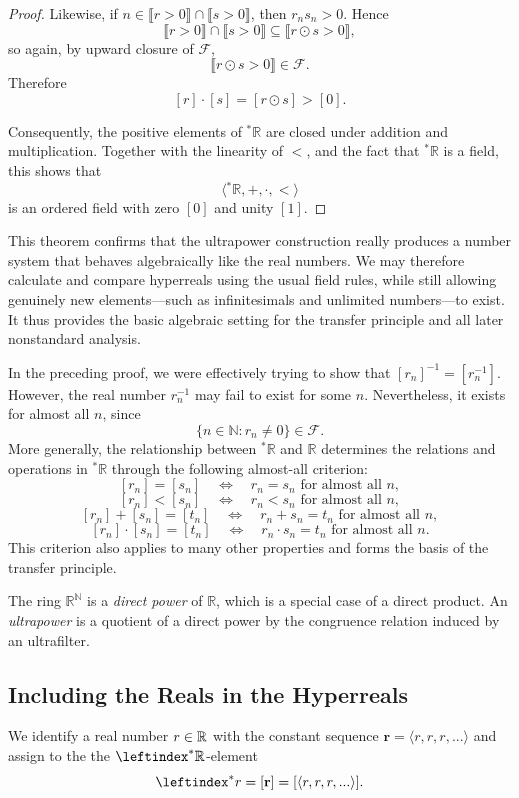 \begin{proof}
Likewise, if
$n\in\llbracket r>0\rrbracket\cap\llbracket s>0\rrbracket$,
then $r_ns_n>0$. Hence
\[
\llbracket r>0\rrbracket\cap\llbracket s>0\rrbracket
\subseteq
\llbracket r\odot s>0\rrbracket,
\]
so again, by upward closure of $\mathcal{F}$,
\[
\llbracket r\odot s>0\rrbracket\in\mathcal{F}.
\]
Therefore
\[
[r]\cdot[s]=[r\odot s]>[0].
\]

Consequently, the positive elements of ${}^*\mathbb{R}$ are closed
under addition and multiplication. Together with the linearity of $<$,
and the fact that ${}^*\mathbb{R}$ is a field, this shows that
\[
\langle{}^*\mathbb{R},+,\cdot,<\rangle
\]
is an ordered field with zero $[0]$ and unity $[1]$.
\end{proof}

This theorem confirms that the ultrapower construction really produces a number system that behaves algebraically like the real numbers. We may therefore calculate and compare hyperreals using the usual field rules, while still allowing genuinely new elements—such as infinitesimals and unlimited numbers—to exist. It thus provides the basic algebraic setting for the transfer principle and all later nonstandard analysis. 

In the preceding proof, we were effectively trying to show that $[r_n]^{-1} = [r_n^{-1}]$. However, the real number $r_n^{-1}$ may fail to exist for some $n$. Nevertheless, it exists for almost all $n$, since
\[
\{n \in \mathbb{N} : r_n \neq 0\} \in \mathcal{F}.
\]
More generally, the relationship between ${}^\ast\mathbb{R}$ and $\mathbb{R}$ determines the relations and operations in ${}^\ast\mathbb{R}$ through the following almost-all criterion:
\[
[r_n] = [s_n]
\quad\Longleftrightarrow\quad
r_n = s_n \text{ for almost all } n,
\]
\[
[r_n] < [s_n]
\quad\Longleftrightarrow\quad
r_n < s_n \text{ for almost all } n,
\]
\[
[r_n] + [s_n] = [t_n]
\quad\Longleftrightarrow\quad
r_n + s_n = t_n \text{ for almost all } n,
\]
\[
[r_n] \cdot [s_n] = [t_n]
\quad\Longleftrightarrow\quad
r_n \cdot s_n = t_n \text{ for almost all } n.
\]
This criterion also applies to many other properties and forms the basis of the transfer principle.

The ring $\mathbb{R}^{\mathbb{N}}$ is a \emph{direct power} of $\mathbb{R}$, which is a special case of a direct product. An \emph{ultrapower} is a quotient of a direct power by the congruence relation induced by an ultrafilter.

\subsection{Including the Reals in the Hyperreals}
We identify a real number $r \in \mathbb{R}$ with the constant sequence $\mathbf{r}=\langle r,r,r,... \rangle$ and assign to the the $\leftindex^* {\R}$-element
$$
\leftindex^* {r} = [\textbf{r}] = [\langle r,r,r,...\rangle].
$$

